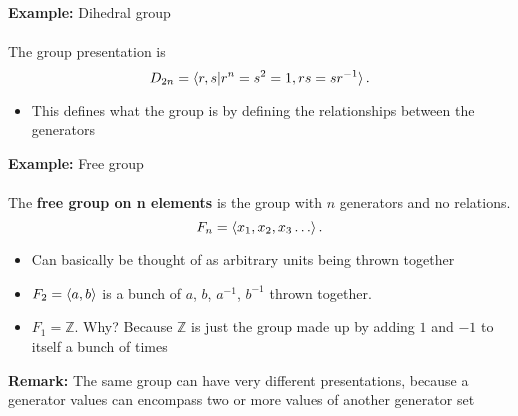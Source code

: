 \documentclass{article}
\newcommand{\Z}{\mathbb{Z}}
\begin{document}
\begin{example} 
\textbf{Example:} Dihedral group \\
~\\
The group presentation is  \[
 D_{2n} = \braket{r,s | r^n = s^2 = 1, rs=sr^{-1}}
.\]
\begin{itemize}
	\item This defines what the group is by defining the relationships between the generators
\end{itemize}
\end{example}
\begin{example} 
\textbf{Example:} Free group \\
~\\
The {\color{blue} \textbf{free group on n elements}} is the group with $n$ generators and no relations.
\[
F_n = \braket{x_1,x_2,x_3\ldots}
.\] 
\begin{itemize}
	\item Can basically be thought of as arbitrary units being thrown together
	\item $F_2 = \braket{a,b}$ is a bunch of $a$, $b$, $a^{-1}$, $b^{-1}$ thrown together.
	\item $F_1 = \Z$. Why? Because $\Z$ is just the group made up by adding $1$ and $-1$ to itself a bunch of times
\end{itemize}
\end{example}
\begin{remark} 
\textbf{Remark:} The same group can have very different presentations, because a generator values can encompass two or more values of another generator set 
\end{remark}
\newpage
\end{document}
